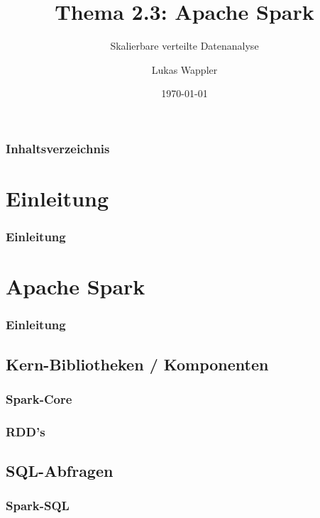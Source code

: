 \documentclass[hyperref={pdfpagelabels=false}]{beamer}
\title{Thema 2.3: Apache Spark}
\subtitle{Skalierbare verteilte Datenanalyse}
\author{Lukas Wappler}
\date{\today}
\begin{document}
\begin{frame}
\titlepage
\end{frame} 


\begin{frame}
\frametitle{Inhaltsverzeichnis}
\setcounter{tocdepth}{1}
\tableofcontents
\end{frame} 



\section{Einleitung} 
\begin{frame}
\frametitle{Einleitung} 
\end{frame}

\section{Apache Spark} 
\begin{frame}
\frametitle{Einleitung} 
\end{frame}

\subsection{Kern-Bibliotheken / Komponenten}
\begin{frame} 

\end{frame}

\subsubsection{Spark-Core}
\begin{frame} 

\end{frame}

\subsubsection{RDD’s}
\begin{frame} 

\end{frame}


\subsection{SQL-Abfragen}
\subsubsection{Spark-SQL}
\begin{frame} 

\end{frame}
\end{document}
